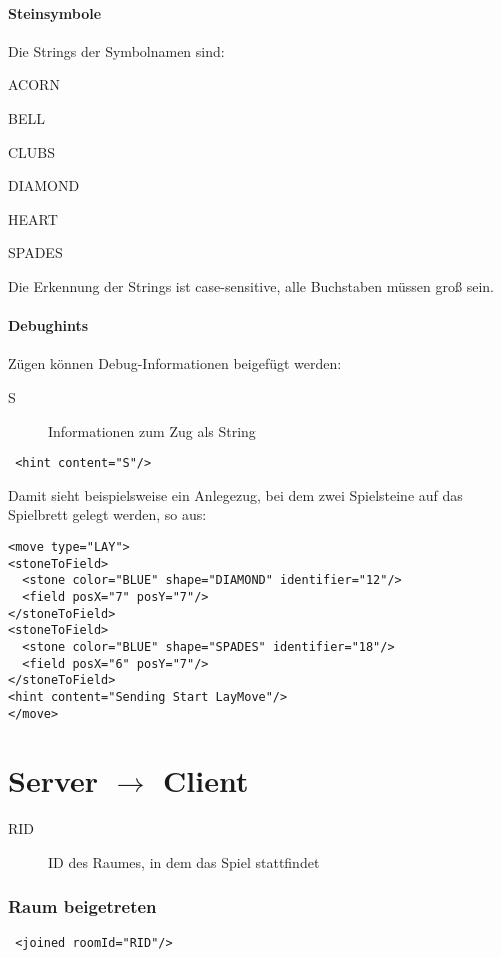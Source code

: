\documentclass[12pt,a4paper, ngerman, oneside]{scrartcl}
\begin{document}
\subsection{\label{stoneSymbols}Steinsymbole}
Die Strings der Symbolnamen sind:
\begin{compactenum}
\item ACORN
\item BELL
\item CLUBS
\item DIAMOND
\item HEART
\item SPADES
\end{compactenum}
Die Erkennung der Strings ist case-sensitive, alle Buchstaben müssen groß
sein.

\subsection{Debughints}
Zügen können Debug-Informationen beigefügt werden:
\begin{description}
\item[S] Informationen zum Zug als String
\end{description}
\begin{verbatim}
 <hint content="S"/>
\end{verbatim}
Damit sieht beispielsweise ein Anlegezug, bei dem zwei Spielsteine auf das Spielbrett gelegt werden, so aus:
\begin{verbatim}
<move type="LAY">
<stoneToField>
  <stone color="BLUE" shape="DIAMOND" identifier="12"/>
  <field posX="7" posY="7"/>
</stoneToField>
<stoneToField>
  <stone color="BLUE" shape="SPADES" identifier="18"/>
  <field posX="6" posY="7"/>
</stoneToField>
<hint content="Sending Start LayMove"/>
</move>
\end{verbatim}



\newpage
\part{Server $\rightarrow$ Client}
\begin{description}
\item[RID] ID des Raumes, in dem das Spiel stattfindet
\end{description}

\section{Raum beigetreten}
 \begin{verbatim}
 <joined roomId="RID"/>
 \end{verbatim}
\end{document}
